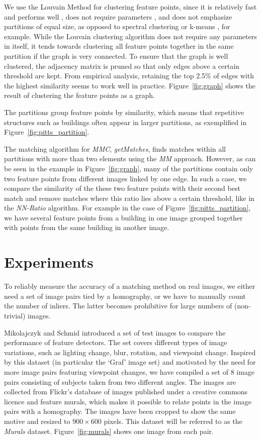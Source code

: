 \documentclass[conference]{IEEEtran}
\begin{document}
We use the Louvain Method \cite{blondel2008} for clustering feature 
points, since it is relatively fast and performs 
well \cite{lancichinetti2009}, does not require 
parameters \cite{blondel2008}, and does not emphasize partitions of equal 
size, as opposed to spectral clustering or 
k-means \cite{von2007}, for example.
While the Louvain clustering algorithm does not require any parameters in 
itself, it tends towards clustering all feature points together in the 
same partition if the graph is very connected.  To ensure that the graph 
is well clustered, the adjacency matrix is pruned so that only edges above a 
certain threshold are kept. From empirical analysis, retaining the top 
2.5\% of edges with the highest similarity seems to work well in 
practice. Figure~\ref{fig:graph} shows the result of clustering the 
feature points as a graph.

The partitions group feature points by similarity, which means that 
repetitive structures such as buildings often appear in larger 
partitions, as exemplified in Figure~\ref{fig:pitts_partition}.

The matching algorithm for \emph{MMC}, \emph{getMatches}, finds matches 
within all partitions with more than two elements using the \emph{MM} 
approach.  However, as can be seen in the example in 
Figure~\ref{fig:graph}, many of the partitions contain only two feature 
points from different images linked by one edge. In such a case, we 
compare the similarity of the these two feature points with their second 
best match and remove matches where this ratio lies above a certain 
threshold, like in the \emph{NN-Ratio} algorithm. For example in the 
case of Figure~\ref{fig:pitts_partition}, we have several feature points 
from a building in one image grouped together with points from the same 
building in another image.
%
\section{Experiments}
\label{S:Experiments}
%
To reliably measure the accuracy of a matching method on real images, we 
either need a set of image pairs tied by a homography, or we have to manually count 
the number of inliers. The latter becomes prohibitive for large numbers of (non-trivial) images. 

Mikolajczyk and Schmid  \cite{mikolajczyk2005performance} introduced a set of test images
to compare the performance of feature detectors. The 
set covers different types of image variations, such as lighting change, 
blur, rotation, and viewpoint change. Inspired by this 
dataset (in particular the `Graf' image set) and motivated by 
the need for more image pairs featuring viewpoint changes, we have 
compiled a set of 8 image pairs consisting of subjects taken from two 
different angles. The images are collected from Flickr's database of 
images published under a creative commons licence and feature murals, 
which makes it possible to relate points in the image pairs with a 
homography.  The images have been cropped to show the same motive and 
resized to $900\times 600$ pixels.  This dataset will be referred to as 
the \emph{Murals} dataset.  Figure~\ref{fig:murals} shows one image from 
each pair.
\end{document}
